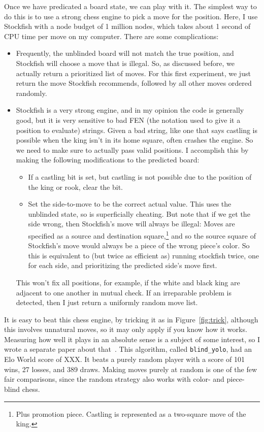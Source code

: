 \documentclass[twocolumn]{amsart}
\begin{document}
Once we have predicated a board state, we can play with it. The
simplest way to do this is to use a strong chess engine to pick a move
for the position. Here, I use Stockfish with a node budget of 1
million nodes, which takes about 1 second of CPU time per move on my
computer. There are some complications:
\begin{itemize}
\item Frequently, the unblinded board will not match the true
  position, and Stockfish will choose a move that is illegal. So, as discussed
  before, we actually return a prioritized list of moves. For this first
  experiment, we just return the move Stockfish recommends, followed by all
  other moves ordered randomly.
\item Stockfish is a very strong engine, and in my opinion the code is generally
  good, but it is very sensitive to bad FEN (the notation used to give it a
  position to evaluate) strings. Given a bad string, like one that says castling
  is possible when the king isn't in its home square, often crashes the engine.
  So we need to make sure to actually pass valid positions. I accomplish this
  by making the following modifications to the predicted board:
  \begin{itemize}
  \item If a castling bit is set, but castling is not possible due to
    the position of the king or rook, clear the bit.
  \item Set the side-to-move to be the correct actual value. This uses
    the unblinded state, so is superficially cheating. But note that
    if we get the side wrong, then Stockfish's move will always be
    illegal: Moves are specified as a source and destination
    square,\footnote{Plus promotion piece. Castling is represented as
      a two-square move of the king.} and so the source square of
    Stockfish's move would always be a piece of the wrong piece's
    color. So this is equivalent to (but twice as efficient as)
    running stockfish twice, one for each side, and prioritizing the
    predicted side's move first.
  \end{itemize}
  This won't fix all positions, for example, if the white and black king are
  adjacent to one another in mutual check. If an irreparable problem is detected,
  then I just return a uniformly random move list.
\end{itemize}

It is easy to beat this chess engine, by tricking it as in
Figure~\ref{fig:trick}, although this involves unnatural moves, so it
may only apply if you know how it works.
Measuring how well it plays in an absolute sense is a subject of some
interest, so I wrote a separate paper about that~\cite{eloworld}. This
algorithm, called \verb+blind_yolo+, had an Elo World score of XXX. It
beats a purely random player with a score of 101 wins, 27 losses, and
389 draws. Making moves purely at random is one of the few fair
comparisons, since the random strategy also works with color- and
piece-blind chess.
\end{document}
